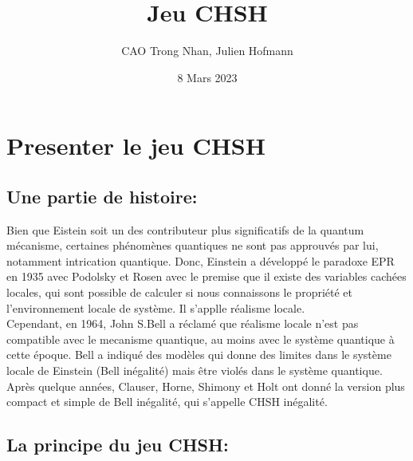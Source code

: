 \documentclass{article}
\title{Jeu CHSH}
\author{CAO Trong Nhan, Julien Hofmann}
\date{ 8 Mars 2023}
\begin{document}
\maketitle

\section{Presenter le jeu CHSH}

\subsection{Une partie de histoire:}

Bien que Eistein soit un des contributeur plus significatifs de la quantum mécanisme, certaines phénomènes quantiques ne sont pas approuvés par lui, notamment intrication quantique. Donc, Einstein a développé le paradoxe EPR en 1935 avec Podolsky et Rosen avec le premise que il existe des variables cachées locales, qui sont possible de calculer si nous connaissons le propriété et l'environnement locale de système. Il s'applle réalisme locale.
\\Cependant, en 1964, John S.Bell a réclamé que réalisme locale n'est pas compatible avec le mecanisme quantique, au moins avec le système quantique à cette époque. Bell a indiqué des modèles qui donne des limites dans le système locale de Einstein (Bell inégalité) mais être violés dans le système quantique. Après quelque années, Clauser, Horne, Shimony et Holt ont donné la version plus compact et simple de Bell inégalité, qui s'appelle CHSH inégalité.

\subsection{La principe du jeu CHSH:}
\end{document}
